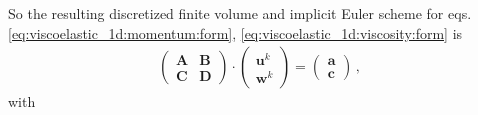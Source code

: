 \documentclass[11pt,a4paper]{article}
\newcommand{\bb}[1]{\boldsymbol{#1}}
\begin{document}
So the resulting discretized finite volume and implicit Euler scheme for eqs. \eqref{eq:viscoelastic_1d:momentum:form}, \eqref{eq:viscoelastic_1d:viscosity:form} is
\begin{align}
    \begin{pmatrix}
        \bb{A} & \bb{B}
        \\
        \bb{C} & \bb{D}
    \end{pmatrix}
    \cdot
    \begin{pmatrix}
        \bb{u}^k
        \\
        \bb{w}^k
    \end{pmatrix}
    = 
    \begin{pmatrix}
        \bb{a}
        \\
        \bb{c}
    \end{pmatrix}
    \,,
    \label{eq:lin_algebra_sys}
\end{align}
with
\end{document}
